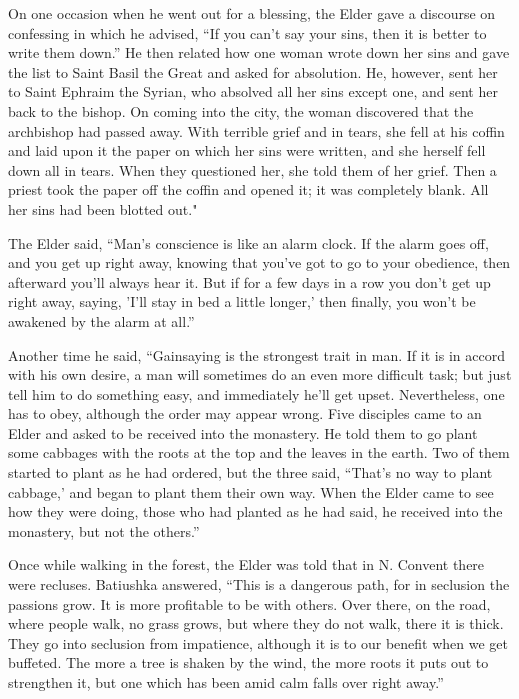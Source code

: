 On one occasion when he went out for a blessing, the Elder gave a discourse on confessing in which he advised, “If you can't say your sins, then it is better to write them down.” He then related how one woman wrote down her sins and gave the list to Saint Basil the Great and asked for absolution. He, however, sent her to Saint Ephraim the Syrian, who absolved all her sins except one, and sent her back to the bishop. On coming into the city, the woman discovered that the archbishop had passed away. With terrible grief and in tears, she fell at his coffin and laid upon it the paper on which her sins were written, and she herself fell down all in tears. When they questioned her, she told them of her grief. Then a priest took the paper off the coffin and opened it; it was completely blank. All her sins had been blotted out."

The Elder said, “Man's conscience is like an alarm clock. If the alarm goes off, and you get up right away, knowing that you've got to go to your obedience, then afterward you'll always hear it. But if for a few days in a row you don't get up right away, saying, 'I'll stay in bed a little longer,' then finally, you won't be awakened by the alarm at all.”

Another time he said, “Gainsaying is the strongest trait in man. If it is in accord with his own desire, a man will sometimes do an even more difficult task; but just tell him to do something easy, and immediately he'll get upset. Nevertheless, one has to obey, although the order may appear wrong. Five disciples came to an Elder and asked to be received into the monastery. He told them to go plant some cabbages with the roots at the top and the leaves in the earth. Two of them started to plant as he had ordered, but the three said, “That's no way to plant cabbage,' and began to plant them their own way. When the Elder came to see how they were doing, those who had planted as he had said, he received into the monastery, but not the others.”

Once while walking in the forest, the Elder was told that in N. Convent there were recluses. Batiushka answered, “This is a dangerous path, for in seclusion the passions grow. It is more profitable to be with others. Over there, on the road, where people walk, no grass grows, but where they do not walk, there it is thick. They go into seclusion from impatience, although it is to our benefit when we get buffeted. The more a tree is shaken by the wind, the more roots it puts out to strengthen it, but one which has been amid calm falls over right away.”


